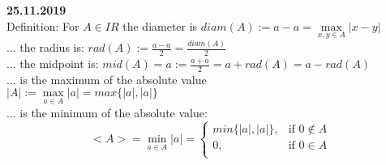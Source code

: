 \documentclass[a4paper, 11pt]{report}
\theoremstyle{break}
\theoremstyle{proofstyle}
\begin{document}

\textbf{25.11.2019} \\
Definition: For $A\in IR$ the diameter is $diam(A):=a-a=\max\limits_{x,y\in A}|x-y|$ \\
... the radius is: $rad(A):=\frac{a-a}{2}=\frac{diam(A)}{2}$ \\
... the midpoint is: $mid(A)=a:=\frac{a+a}{2}=a+rad(A)=a-rad(A)$ \\
... is the maximum of the absolute value \\
$|A|:=\max\limits_{a\in A}|a|=max\{|a|,|a|\}$ \\
... is the minimum of the absolute value:
$$
      <A>=\min\limits_{a\in A}|a|=
      \begin{cases}
        min\{|a|,|a|\}, & \text{if } 0\not \in A\\
        0, & \text{if } 0\in A \\
      \end{cases}
    $$ \\
\end{document}
